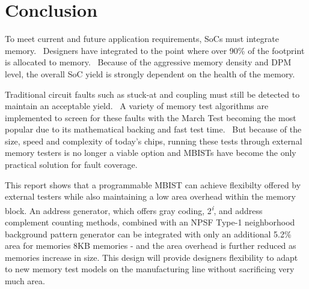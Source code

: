 \chapter{Conclusion}
\label{chap:conclusion}
To meet current and future application requirements, SoCs must integrate memory.  Designers have integrated to the point where over 90\% of the footprint is allocated to memory.  Because of the aggressive memory density and DPM level, the overall SoC yield is strongly dependent on the health of the memory.  

Traditional circuit faults such as stuck-at and coupling must still be detected to maintain an acceptable yield.  A variety of memory test algorithms are implemented to screen for these faults with the March Test becoming the most popular due to its mathematical backing and fast test time.  But because of the size, speed and complexity of today’s chips, running these tests through external memory testers is no longer a viable option and MBISTs have become the only practical solution for fault coverage.  

This report shows that a programmable MBIST can achieve flexibilty offered by external testers while also maintaining a low area overhead within the memory block.  An address generator, which offers gray coding, 2\textsuperscript{\textit{i}}, and address complement counting methods, combined with an NPSF Type-1 neighborhood background pattern generator can be integrated with only an additional 5.2\% area for memories 8KB memories - and the area overhead is further reduced as memories increase in size.  This design will provide designers flexibility to adapt to new memory test models on the manufacturing line without sacrificing very much area.  


